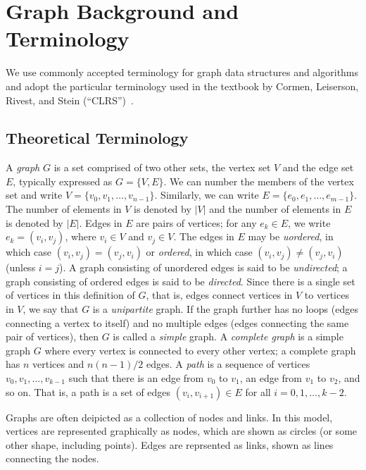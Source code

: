 \section{Graph Background and Terminology}

We use commonly accepted terminology for graph data structures and algorithms and 
adopt the particular terminology used in the textbook by
Cormen, Leiserson, Rivest, and Stein (``CLRS'')~\cite{CLRS2022}.

\subsection{Theoretical Terminology}

A \emph{graph} $G$ is a set comprised of two other sets, the vertex set $V$ and the edge set $E$, 
typically expressed as $G=\{V,E\}$.  We can number the members of the vertex set
and write $V = \{ v_0, v_1, \ldots , v_{n-1} \}$.  Similarly, we can write $E = \{ e_0, e_1, \ldots, e_{m-1} \}$.  The number of elements in $V$ is denoted by $|V|$ and the number of elements in $E$ is denoted by $|E|$.  Edges in $E$ are pairs of vertices; for any $e_k \in E$, we write $e_k = ( v_i, v_j )$, where $v_i \in V$ and $v_j\in V$.  The edges in $E$ may be \emph{uordered}, in which case $(v_i, v_j) = (v_j, v_i)$ or \emph{ordered}, in which case $(v_i, v_j) \neq (v_j, v_i)$ (unless $i = j$).
A graph consisting of unordered edges is said to be \emph{undirected}; 
a graph consisting of ordered edges is said to be \emph{directed}.
Since there is a single set of vertices in this definition of $G$, that is, edges connect
vertices in $V$ to vertices in $V$, we say that
$G$ is a \emph{unipartite} graph.
If the graph further has no loops (edges connecting a vertex to itself)
and no multiple edges (edges connecting the same pair of vertices),
then $G$ is called a \emph{simple} graph.
A \emph{complete graph} is a simple graph $G$ where every vertex is connected
to every other vertex; a complete graph has
$n$ vertices and $n(n-1)/2$ edges.
A \emph{path} is a sequence of vertices $v_0, v_1, \ldots, v_{k-1}$ such that
there is an edge from $v_0$ to $v_1$, an edge from $v_1$ to $v_2$, and so on.
That is, a path is a set of edges $(v_i, v_{i+1}) \in E$ for all $i = 0, 1, \ldots, k-2$.

Graphs are often deipicted as a collection of nodes and links.  In this model, vertices are
represented graphically as nodes, which are
shown as circles (or some other shape, including points).  Edges are reprsented as links,
shown as lines connecting the nodes.


